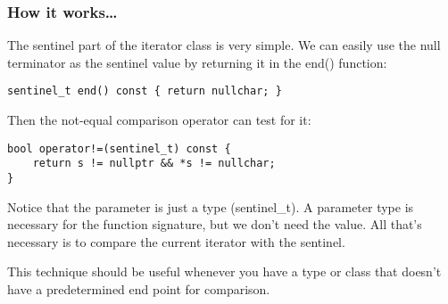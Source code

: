 \subsubsection{How it works…}

The sentinel part of the iterator class is very simple. We can easily use the null terminator as the sentinel value by returning it in the end() function:

\begin{lstlisting}[style=styleCXX]
sentinel_t end() const { return nullchar; }
\end{lstlisting}

Then the not-equal comparison operator can test for it:

\begin{lstlisting}[style=styleCXX]
bool operator!=(sentinel_t) const {
	return s != nullptr && *s != nullchar;
}
\end{lstlisting}


Notice that the parameter is just a type (sentinel\_t). A parameter type is necessary for the function signature, but we don't need the value. All that's necessary is to compare the current iterator with the sentinel.

This technique should be useful whenever you have a type or class that doesn't have a predetermined end point for comparison.



















